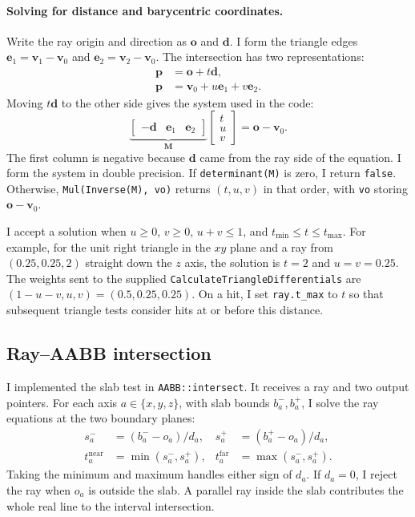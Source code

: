 \documentclass[acmtog]{acmart}
\begin{document}
\paragraph{Solving for distance and barycentric coordinates.}
Write the ray origin and direction as $\mathbf o$ and $\mathbf d$. I form the triangle edges $\mathbf e_1=\mathbf v_1-\mathbf v_0$ and $\mathbf e_2=\mathbf v_2-\mathbf v_0$. The intersection has two representations:
\begin{align}
\mathbf p &= \mathbf o+t\mathbf d,\\
\mathbf p &= \mathbf v_0+u\mathbf e_1+v\mathbf e_2 .
\end{align}
Moving $t\mathbf d$ to the other side gives the system used in the code:
\begin{equation}
\underbrace{\begin{bmatrix}
-\mathbf d & \mathbf e_1 & \mathbf e_2
\end{bmatrix}}_{\mathbf M}
\begin{bmatrix}t\\u\\v\end{bmatrix}
=\mathbf o-\mathbf v_0 .
\end{equation}
The first column is negative because $\mathbf d$ came from the ray side of the equation. I form the system in double precision. If \texttt{determinant(M)} is zero, I return \texttt{false}. Otherwise, \texttt{Mul(Inverse(M), vo)} returns $(t,u,v)$ in that order, with \texttt{vo} storing $\mathbf o-\mathbf v_0$.

I accept a solution when $u\geq0$, $v\geq0$, $u+v\leq1$, and $t_{\min}\leq t\leq t_{\max}$. For example, for the unit right triangle in the $xy$ plane and a ray from $(0.25,0.25,2)$ straight down the $z$ axis, the solution is $t=2$ and $u=v=0.25$. The weights sent to the supplied \texttt{CalculateTriangleDifferentials} are $(1-u-v,u,v)=(0.5,0.25,0.25)$. On a hit, I set \texttt{ray.t\_max} to $t$ so that subsequent triangle tests consider hits at or before this distance.

\subsection{Ray--AABB intersection}
I implemented the slab test in \texttt{AABB::intersect}. It receives a ray and two output pointers. For each axis $a\in\{x,y,z\}$, with slab bounds $b_a^-,b_a^+$, I solve the ray equations at the two boundary planes:
\begin{align}
s_a^- &= (b_a^- - o_a)/d_a, &
s_a^+ &= (b_a^+ - o_a)/d_a,\\
t_a^{\mathrm{near}}&=\min(s_a^-,s_a^+), &
t_a^{\mathrm{far}}&=\max(s_a^-,s_a^+).
\end{align}
Taking the minimum and maximum handles either sign of $d_a$. If $d_a=0$, I reject the ray when $o_a$ is outside the slab. A parallel ray inside the slab contributes the whole real line to the interval intersection.
\end{document}
